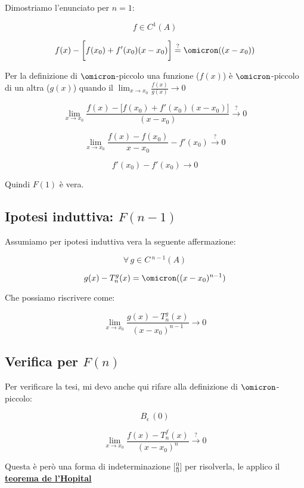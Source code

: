 \documentclass[../dimostrazioni]{subfiles}
\begin{document}
        Dimostriamo l'enunciato per \(n = 1\):
        
        \[  f \in C^1(A)  \]

        \[  f(x) - \bigg[ f(x_0) + f'(x_0)(x-x_0) \bigg] \stackrel{?}{=}  \omicron ((x-x_0))  \]

        Per la definizione di \(\omicron\)-piccolo una funzione (\(f(x)\)) è \(\omicron\)-piccolo di un altra (\(g(x)\)) quando il \( \lim_{x \to x_0} \frac{f(x)}{g(x)} \rightarrow 0\) 
        
        \[    \lim_{x \to x_0} \frac{f(x) - \bigg[ f(x_0) + f'(x_0)(x-x_0) \bigg]}{(x-x_0)} \stackrel{?}{\rightarrow} 0 \]
            
        \[    \lim_{x \to x_0} \frac{f(x) - f(x_0)}{x - x_0} - f'(x_0) \stackrel{?}{\rightarrow} 0 \]

        \[    f'(x_0) - f'(x_0) \rightarrow 0 \]

        Quindi \(F(1)\) è vera. 

        \subsection*{Ipotesi induttiva: \(F(n-1)\)}

        Assumiamo per ipotesi induttiva vera la seguente affermazione:
        
        \[  \forall \, g \in C\,^{n-1} (A) \]

        \[  g(x) - T _n ^ g (x) = \omicron ((x-x_0)^{n-1}) \]

        Che possiamo riscrivere come:

        \[  \lim_{x \to x_0} \frac{g(x) - T _n ^ g (x)}{(x-x_0)^{n-1}} \rightarrow 0 \]

        \subsection*{Verifica per \(F(n)\)}

        Per verificare la tesi, mi devo anche qui rifare alla definizione di \(\omicron\)-piccolo:
        
        \[ B_\epsilon \, (0)\]

        \[  \lim_{x \to x_0} \frac{f(x)-T _n ^ f (x)}{(x-x_0)^n} \stackrel{?}{\rightarrow} 0\]

        Questa è però una forma di indeterminazione \(\bigg[\frac{0}{0}\bigg]\) per risolverla, le applico il \textbf{\hyperref[teoHopital]{teorema de l'Hopital}}
        
\end{document}
